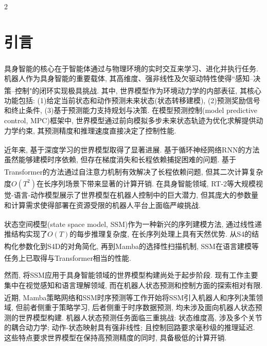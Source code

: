 \renewcommand\refname{\normalsize{{\CJKfamily{hei}参考文献}}}
\setlength{\oddsidemargin}{-.5cm}
 \setlength{\textwidth}{171mm}
\vspace{10pt}
\enlargethispage{-10mm}
\begin{multicols}{2}
\fontsize{10.5bp}{12.9bp}\selectfont

\section{引言}

具身智能的核心在于智能体通过与物理环境的实时交互来学习、进化并执行任务\textsuperscript{\cite{1}}.
机器人作为具身智能的重要载体, 其高维度、强非线性及欠驱动特性使得``感知--决策--控制"的闭环实现极具挑战.
其中, 世界模型\textsuperscript{\cite{2}}作为环境动力学的内部表征, 其核心功能包括:
(1)给定当前状态和动作预测未来状态(状态转移建模),
(2)预测奖励信号和终止条件,
(3)基于预测能力支持规划与决策.
在模型预测控制(model predictive control, MPC)框架中,
世界模型通过前向模拟多步未来状态轨迹为优化求解提供动力学约束,
其预测精度和推理速度直接决定了控制性能.

近年来, 基于深度学习的世界模型取得了显著进展.
基于循环神经网络RNN的方法\textsuperscript{\cite{3}}虽然能够建模时序依赖, 但存在梯度消失和长程依赖捕捉困难的问题.
基于Transformer的方法\textsuperscript{\cite{4}}通过自注意力机制有效解决了长程依赖问题,
但其二次计算复杂度$O(T^2)$在长序列场景下带来显著的计算开销.
在具身智能领域, RT-2\textsuperscript{\cite{5}}等大规模视觉-语言-动作模型展示了世界模型在机器人控制中的巨大潜力,
但其庞大的参数量和计算需求使得部署在资源受限的机器人平台上面临严峻挑战.

状态空间模型(state space model, SSM)\textsuperscript{\cite{6}}作为一种新兴的序列建模方法,
通过线性递推结构实现了$O(T)$的每步推理复杂度, 在长序列处理上具有天然优势.
从S4的结构化参数化到S4D\textsuperscript{\cite{7}}的对角简化,
再到Mamba\textsuperscript{\cite{8}}的选择性扫描机制, SSM在语言建模等任务上已取得与Transformer相当的性能\textsuperscript{\cite{9}}.

然而, 将SSM应用于具身智能领域的世界模型构建尚处于起步阶段.
现有工作主要集中在视觉感知和语言理解领域,
而在机器人状态预测和控制方面的探索相对有限.
近期, Mamba策略网络\textsuperscript{\cite{20,21}}和SSM时序预测\textsuperscript{\cite{22}}等工作开始将SSM引入机器人和序列决策领域,
但前者侧重于策略学习, 后者侧重于时序数据预测,
均未涉及面向机器人状态预测的世界模型构建.
机器人状态预测任务面临三重挑战: 状态维度高, 涉及多个关节的耦合动力学; 动作-状态映射具有强非线性; 且控制回路要求毫秒级的推理延迟.
这些特点要求世界模型在保持高预测精度的同时, 具备极低的计算开销.


\end{multicols}
